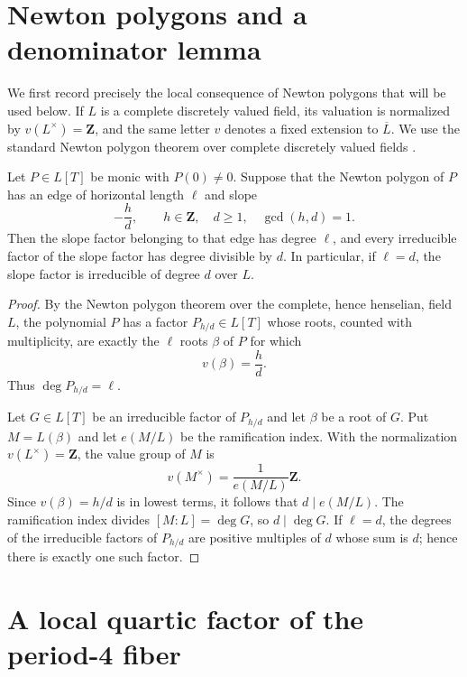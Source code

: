 \section{Newton polygons and a denominator lemma}
\label{sec:newton-denominator}

We first record precisely the local consequence of Newton polygons that
will be used below.  If $L$ is a complete discretely valued field, its
valuation is normalized by $v(L^\times)=\mathbf Z$, and the same letter
$v$ denotes a fixed extension to $\overline{L}$.  We use the standard
Newton polygon theorem over complete discretely valued fields
\cite[Chapter II]{Serre1979}.

\begin{lemma}
\label{lem:newton-denominator}
Let $P\in L[T]$ be monic with $P(0)\ne0$.  Suppose that the Newton
polygon of $P$ has an edge of horizontal length $\ell$ and slope
\[
 -\frac{h}{d},
 \qquad h\in\mathbf Z,
 \quad d\geq1,
 \quad \gcd(h,d)=1.
\]
Then the slope factor belonging to that edge has degree $\ell$, and
every irreducible factor of the slope factor has degree divisible by
$d$.  In particular, if $\ell=d$, the slope factor is irreducible of
degree $d$ over $L$.
\end{lemma}

\begin{proof}
By the Newton polygon theorem over the complete, hence henselian, field
$L$, the polynomial $P$ has a factor $P_{h/d}\in L[T]$ whose roots,
counted with multiplicity, are exactly the $\ell$ roots $\beta$ of $P$
for which
\[
 v(\beta)=\frac{h}{d}.
\]
Thus $\deg P_{h/d}=\ell$.

Let $G\in L[T]$ be an irreducible factor of $P_{h/d}$ and let $\beta$
be a root of $G$.  Put $M=L(\beta)$ and let $e(M/L)$ be the ramification
index.  With the normalization $v(L^\times)=\mathbf Z$, the value group
of $M$ is
\[
 v(M^\times)=\frac1{e(M/L)}\mathbf Z.
\]
Since $v(\beta)=h/d$ is in lowest terms, it follows that
$d\mid e(M/L)$.  The ramification index divides $[M:L]=\deg G$, so
$d\mid\deg G$.  If $\ell=d$, the degrees of the irreducible factors of
$P_{h/d}$ are positive multiples of $d$ whose sum is $d$; hence there
is exactly one such factor.
\end{proof}

\section{A local quartic factor of the period-4 fiber}
\label{sec:local-quartic-fiber}


